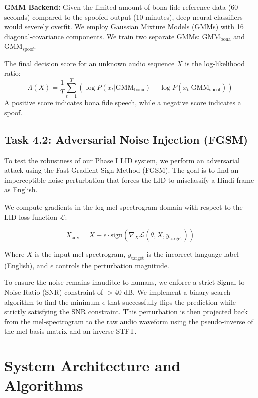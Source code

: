 \documentclass[conference]{IEEEtran}
\begin{document}
\textbf{GMM Backend:} Given the limited amount of bona fide reference data (60 seconds) compared to the spoofed output (10 minutes), deep neural classifiers would severely overfit. We employ Gaussian Mixture Models (GMMs) with 16 diagonal-covariance components. We train two separate GMMs: $\text{GMM}_{\text{bona}}$ and $\text{GMM}_{\text{spoof}}$.

The final decision score for an unknown audio sequence $X$ is the log-likelihood ratio:
\begin{equation}
\Lambda(X) = \frac{1}{T} \sum_{t=1}^T \left( \log P(x_t | \text{GMM}_{\text{bona}}) - \log P(x_t | \text{GMM}_{\text{spoof}}) \right)
\end{equation}
A positive score indicates bona fide speech, while a negative score indicates a spoof.

\subsection{Task 4.2: Adversarial Noise Injection (FGSM)}

To test the robustness of our Phase I LID system, we perform an adversarial attack using the Fast Gradient Sign Method (FGSM). The goal is to find an imperceptible noise perturbation that forces the LID to misclassify a Hindi frame as English.

We compute gradients in the log-mel spectrogram domain with respect to the LID loss function $\mathcal{L}$:

\begin{equation}
X_{\text{adv}} = X + \epsilon \cdot \text{sign}\left(\nabla_X \mathcal{L}(\theta, X, y_{\text{target}})\right)
\end{equation}

Where $X$ is the input mel-spectrogram, $y_{\text{target}}$ is the incorrect language label (English), and $\epsilon$ controls the perturbation magnitude. 

To ensure the noise remains inaudible to humans, we enforce a strict Signal-to-Noise Ratio (SNR) constraint of $>40$ dB. We implement a binary search algorithm to find the minimum $\epsilon$ that successfully flips the prediction while strictly satisfying the SNR constraint. This perturbation is then projected back from the mel-spectrogram to the raw audio waveform using the pseudo-inverse of the mel basis matrix and an inverse STFT.

\section{System Architecture and Algorithms}
\end{document}
